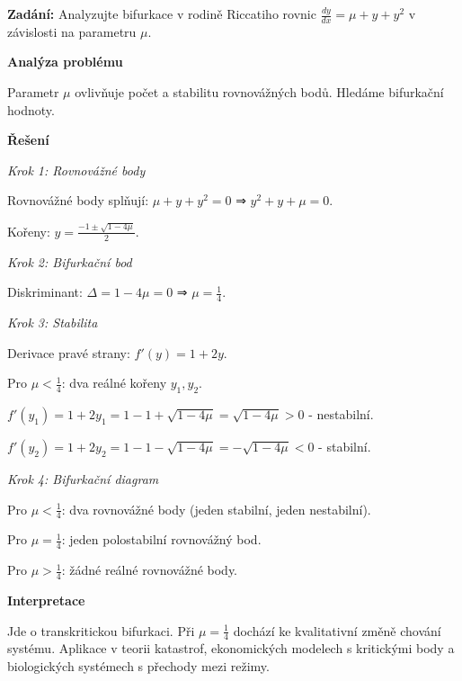 \vspace{2\baselineskip}

\begin{example}
\label{ex:d2-bifurkace}

\noindent\textbf{Zadání:} Analyzujte bifurkace v rodině Riccatiho rovnic $\frac{dy}{dx} = \mu + y + y^2$ v závislosti na parametru $\mu$.

\vspace{1.5\baselineskip}

\noindent\textbf{Analýza problému}

\noindent Parametr $\mu$ ovlivňuje počet a stabilitu rovnovážných bodů. Hledáme bifurkační hodnoty.

\vspace{1.5\baselineskip}

\noindent\textbf{Řešení}

\noindent\textit{Krok 1: Rovnovážné body}

Rovnovážné body splňují: $\mu + y + y^2 = 0$ ⇒ $y^2 + y + \mu = 0$.

Kořeny: $y = \frac{-1 \pm \sqrt{1 - 4\mu}}{2}$.

\noindent\textit{Krok 2: Bifurkační bod}

Diskriminant: $\Delta = 1 - 4\mu = 0$ ⇒ $\mu = \frac{1}{4}$.

\noindent\textit{Krok 3: Stabilita}

Derivace pravé strany: $f'(y) = 1 + 2y$.

Pro $\mu < \frac{1}{4}$: dva reálné kořeny $y_1, y_2$.

$f'(y_1) = 1 + 2y_1 = 1 - 1 + \sqrt{1 - 4\mu} = \sqrt{1 - 4\mu} > 0$ - nestabilní.

$f'(y_2) = 1 + 2y_2 = 1 - 1 - \sqrt{1 - 4\mu} = -\sqrt{1 - 4\mu} < 0$ - stabilní.

\noindent\textit{Krok 4: Bifurkační diagram}

Pro $\mu < \frac{1}{4}$: dva rovnovážné body (jeden stabilní, jeden nestabilní).

Pro $\mu = \frac{1}{4}$: jeden polostabilní rovnovážný bod.

Pro $\mu > \frac{1}{4}$: žádné reálné rovnovážné body.

\vspace{1.5\baselineskip}

\noindent\textbf{Interpretace}

Jde o transkritickou bifurkaci. Při $\mu = \frac{1}{4}$ dochází ke kvalitativní 
změně chování systému. Aplikace v teorii katastrof, ekonomických modelech 
s kritickými body a biologických systémech s přechody mezi režimy.

\end{example}

